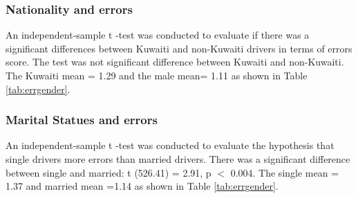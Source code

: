 \documentclass[preprint,12pt,a4paper,authoryear]{elsarticle}
\begin{document}
\subsubsection{Nationality and errors }
An independent-sample t -test was conducted to evaluate if there was a significant differences between Kuwaiti and non-Kuwaiti drivers in terms of errors score. The test was not significant difference between Kuwaiti and non-Kuwaiti. The Kuwaiti mean = 1.29 and the male mean= 1.11 as shown in Table \ref{tab:errgender}.

\subsubsection{Marital Statues and errors}
An independent-sample t -test was conducted to evaluate the hypothesis that single drivers more errors than married drivers. There was a significant difference between single and married: t (526.41) = 2.91, p $<$ 0.004. The single mean = 1.37 and married mean =1.14 as shown in Table \ref{tab:errgender}.

\begin{table}[H]
\centering
\caption{My caption}
\label{tab:errgender}
\end{table}
\end{document}
